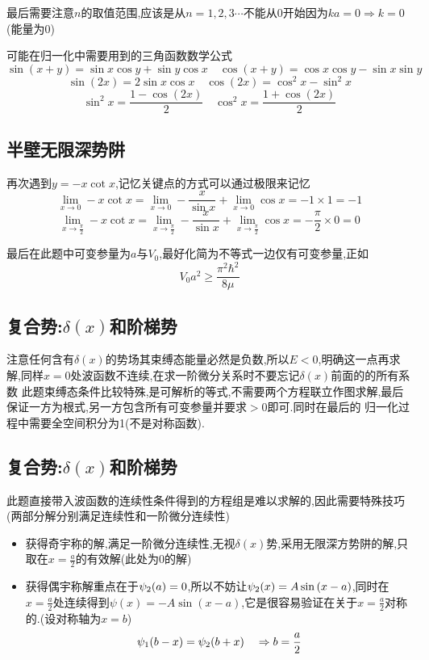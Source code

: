 \documentclass{article}
\begin{document}
        最后需要注意$n$的取值范围,应该是从$n=1,2,3\cdots$不能从0开始因为$ka=0 \Rightarrow k=0$(能量为0)
        
        可能在归一化中需要用到的三角函数数学公式
        $$\sin(x+y)=\sin{x} \cos{y}+\sin{y}\cos{x} \quad \cos(x+y)=\cos{x} \cos{y} - \sin{x}\sin{y}$$ 
        $$\sin(2x) = 2\sin{x} \cos{x} \quad \cos(2x) = \cos^{2}{x} - \sin^{2}{x} $$
        $$\sin^{2}{x}=\frac{1-\cos(2x)}{2} \quad \cos^{2}{x}=\frac{1+\cos(2x)}{2} $$

    \subsection{半壁无限深势阱}
        再次遇到$y=-x \cot{x}$,记忆关键点的方式可以通过极限来记忆
        $$\lim_{x \to 0}- x \cot{x} = \lim_{x \to 0} -\frac{x}{\sin{x}} + \lim_{x \to 0}\cos{x} = -1 \times 1 = -1  $$
        $$\lim_{x \to \frac{\pi}{2}}- x \cot{x} = \lim_{x \to \frac{\pi}{2}} -\frac{x}{\sin{x}} + \lim_{x \to \frac{\pi}{2}}\cos{x} = -\frac{\pi}{2} \times 0 = 0  $$
        
        最后在此题中可变参量为$a$与$V_{0}$,最好化简为不等式一边仅有可变参量,正如
        $$V_{0}a^{2}\geq \frac{\pi^{2}\hbar^{2}}{8 \mu} $$

    \subsection{复合势:\texorpdfstring{$\delta(x)$}{}和阶梯势}
        注意任何含有$\delta(x)$的势场其束缚态能量必然是负数,所以$E<0$,明确这一点再求解,同样$x=0$处波函数不连续,在求一阶微分关系时不要忘记$\delta(x)$前面的的所有系数
        此题束缚态条件比较特殊,是可解析的等式,不需要两个方程联立作图求解,最后保证一方为根式,另一方包含所有可变参量并要求$>0$即可.同时在最后的
        归一化过程中需要全空间积分为1(不是对称函数).

    \subsection{复合势:\texorpdfstring{$\delta(x)$}{}和阶梯势}
        此题直接带入波函数的连续性条件得到的方程组是难以求解的,因此需要特殊技巧(两部分解分别满足连续性和一阶微分连续性)
        \begin{itemize}
            \item 获得奇宇称的解,满足一阶微分连续性,无视$\delta(x)$势,采用无限深方势阱的解,只取在$x=\frac{a}{2}$的有效解(此处为0的解)
            \item 获得偶宇称解重点在于$\psi_{2} (a)=0$,所以不妨让$\psi_{2} (x)=A \sin{(x-a)}$,同时在$x=\frac{a}{2}$处连续得到$\psi(x)=-A \sin{(x-a)}$,它是很容易验证在关于$x=\frac{a}{2}$对称的.(设对称轴为$x=b$)
                $$\psi_{1} (b-x)=\psi_{2} (b+x) \quad \Rightarrow b=\frac{a}{2}$$
        \end{itemize}
\end{document}
